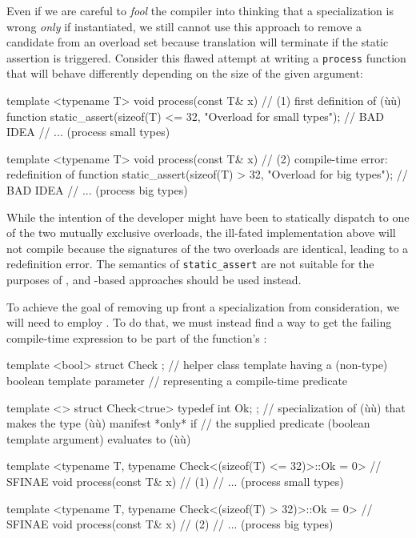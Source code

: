 Even if we are careful to \emph{fool} the compiler into thinking that a
specialization is wrong \emph{only} if instantiated, we still cannot use
this approach to remove a candidate from an overload set because translation
will terminate if the static assertion is triggered. Consider this
flawed attempt at writing a \lstinline!process! function that will behave
differently depending on the size of the given argument:

\begin{emcppslisting}[emcppserrorlines={8,9,10,11,12,13}]
template <typename T>
void process(const T& x)  // (1) first definition of (ù{}ù) function
{
    static_assert(sizeof(T) <= 32, "Overload for small types");  // BAD IDEA
    // ... (process small types)
}

template <typename T>
void process(const T& x)  // (2) compile-time error: redefinition of function
{
    static_assert(sizeof(T) > 32, "Overload for big types");     // BAD IDEA
    // ... (process big types)
}
\end{emcppslisting}

\noindent While the intention of the developer might have been to statically
dispatch to one of the two mutually exclusive overloads, the ill-fated
implementation above will not compile because the signatures of the two
overloads are identical, leading to a redefinition error. The semantics
of \lstinline!static_assert! are not suitable for the purposes of
, and -based approaches should be used instead.

To achieve the goal of removing up
front a specialization from consideration, we will need to employ
. To do that, we must instead find a way to get the
failing compile-time expression to be part of the function's
:

\begin{emcppslisting}[emcppsbatch=e6]
template <bool> struct Check { };
    // helper class template having a (non-type) boolean template parameter
    // representing a compile-time predicate

template <> struct Check<true> { typedef int Ok; };
    // specialization of (ù{}ù) that makes the type (ù{}ù) manifest *only* if
    // the supplied predicate (boolean template argument) evaluates to (ù{}ù)

template <typename T,
          typename Check<(sizeof(T) <= 32)>::Ok = 0>  // SFINAE
void process(const T& x)  // (1)
{
    // ... (process small types)
}

template <typename T,
          typename Check<(sizeof(T) > 32)>::Ok = 0>  // SFINAE
void process(const T& x)  // (2)
{
    // ... (process big types)
}
\end{emcppslisting}

